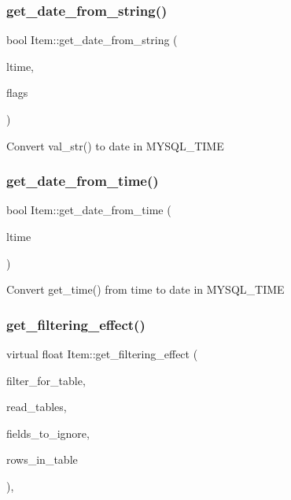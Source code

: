 \subsubsection{\texorpdfstring{get\+\_\+date\+\_\+from\+\_\+string()}{get\_date\_from\_string()}}
{\footnotesize\ttfamily bool Item\+::get\+\_\+date\+\_\+from\+\_\+string (\begin{DoxyParamCaption}\item[{M\+Y\+S\+Q\+L\+\_\+\+T\+I\+ME $\ast$}]{ltime,  }\item[{my\+\_\+time\+\_\+flags\+\_\+t}]{flags }\end{DoxyParamCaption})\hspace{0.3cm}{\ttfamily [protected]}}

Convert val\+\_\+str() to date in M\+Y\+S\+Q\+L\+\_\+\+T\+I\+ME \mbox{\label{classItem_a3a3f871daa34d4863f4e4968499cc211}} 
\subsubsection{\texorpdfstring{get\+\_\+date\+\_\+from\+\_\+time()}{get\_date\_from\_time()}}
{\footnotesize\ttfamily bool Item\+::get\+\_\+date\+\_\+from\+\_\+time (\begin{DoxyParamCaption}\item[{M\+Y\+S\+Q\+L\+\_\+\+T\+I\+ME $\ast$}]{ltime }\end{DoxyParamCaption})\hspace{0.3cm}{\ttfamily [protected]}}

Convert get\+\_\+time() from time to date in M\+Y\+S\+Q\+L\+\_\+\+T\+I\+ME \mbox{\label{classItem_a83f65da25aae04ad1aecebc1d43832c0}} 
\subsubsection{\texorpdfstring{get\+\_\+filtering\+\_\+effect()}{get\_filtering\_effect()}}
{\footnotesize\ttfamily virtual float Item\+::get\+\_\+filtering\+\_\+effect (\begin{DoxyParamCaption}\item[{table\+\_\+map}]{filter\+\_\+for\+\_\+table,  }\item[{table\+\_\+map}]{read\+\_\+tables,  }\item[{const M\+Y\+\_\+\+B\+I\+T\+M\+AP $\ast$}]{fields\+\_\+to\+\_\+ignore,  }\item[{double}]{rows\+\_\+in\+\_\+table }\end{DoxyParamCaption})\hspace{0.3cm}{\ttfamily [inline]}, {\ttfamily [virtual]}}


